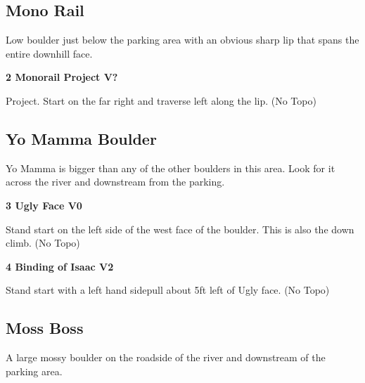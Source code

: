 \begin{multicols}{2}
\needspace{1.5cm}
\subsection*{Mono Rail}\label{bf:Mono Rail}
Low boulder just below the parking area with an obvious sharp lip that spans the entire downhill face.\\
	


\needspace{1.5cm}
\label{rt:Monorail Project}
\colorbox{black!20}{
\parbox{0.95\linewidth}{
\textbf{
2 Monorail Project V?  
}}}

\begin{adjustwidth}{0.5cm}{}			
Project. Start on the far right and traverse left along the lip. (No Topo)
\end{adjustwidth}




\needspace{1.5cm}
\subsection*{Yo Mamma Boulder}\label{bf:Yo Mamma Boulder}
Yo Mamma is bigger than any of the other boulders in this area. Look for it across the river and downstream from the parking.\\
	


\needspace{1.5cm}
\label{rt:Ugly Face}
\colorbox{green!20}{
\parbox{0.95\linewidth}{
\textbf{
3 Ugly Face V0  \warn
}}}

\begin{adjustwidth}{0.5cm}{}			
Stand start on the left side of the west face of the boulder. This is also the down climb. (No Topo)
\end{adjustwidth}



\needspace{1.5cm}
\label{rt:Binding of Isaac}
\colorbox{green!20}{
\parbox{0.95\linewidth}{
\textbf{
4 Binding of Isaac V2  \warn
}}}

\begin{adjustwidth}{0.5cm}{}			
Stand start with a left hand sidepull about 5ft left of Ugly face. (No Topo)
\end{adjustwidth}




\needspace{1.5cm}
\subsection*{Moss Boss}\label{bf:Moss Boss}
A large mossy boulder on the roadside of the river and downstream of the parking area.\\
	



\end{multicols}
